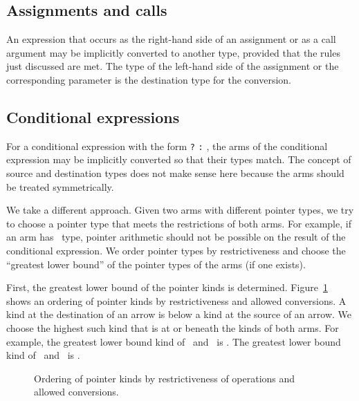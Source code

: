 \subsection{Assignments and calls}

An expression that occurs as the right-hand side of an assignment or as
a call argument may be implicitly converted to another type, provided
that the rules just discussed are met.
The type of the left-hand side of the assignment or the corresponding
parameter is the destination type for the conversion.

\subsection{Conditional expressions}

For a conditional expression with the form  \texttt{?} 
\texttt{:} , the arms of the conditional expression may be implicitly
converted so that their types  match.  The concept of source and destination types
does not make sense here because the arms should be treated symmetrically.

We take a different approach.  Given two arms with different pointer types, we try
to choose a pointer type that meets the restrictions of both arms.  For example, if
an arm has \ptr\ type, pointer arithmetic should not be possible on the result
of the conditional expression.   We order pointer types by restrictiveness
and choose the ``greatest lower bound'' of the pointer types of the arms (if one exists).

First, the greatest lower bound of the pointer kinds is determined.
Figure~\ref{fig:pointer-kind-ordering} shows an ordering  of pointer kinds by
restrictiveness and allowed conversions.   A kind at the destination of an arrow is below a kind
at the source of an arrow.  We choose the highest such kind that is at or beneath the
kinds of both arms.   For example, the greatest lower bound
kind of \ptr\ and \uncheckedptr\ is \ptr. The greatest lower bound kind
of \uncheckedptr\ and \ntarrayptr\ is \arrayptr.
\begin{figure}
\begin{center}
\end{center}
\caption{Ordering of pointer kinds by restrictiveness of operations and allowed conversions.}
\label{fig:pointer-kind-ordering}
\end{figure}

